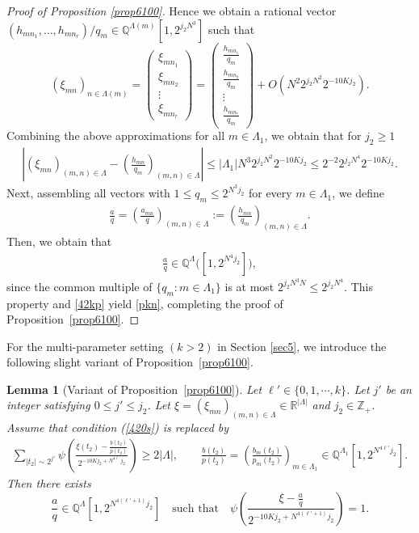 \documentclass[11 pt,letterpaper]{amsart}
\theoremstyle{plain}
\newtheorem{lemma}{Lemma}\numberwithin{lemma}{section}
\theoremstyle{definition}
\theoremstyle{remark} \theoremstyle{exam} \theoremstyle{ob}
\numberwithin{equation}{section}
\begin{document}
\begin{proof}[Proof of Proposition \ref{prop6100}]
Hence we obtain a rational vector 
$(h_{mn_1}, \dots, h_{mn_r})/q_m 
\in \mathbb{Q}^{\Lambda(m)}[1, 2^{j_2 N^3}]$ 
such that
\[
(\xi_{mn})_{n \in \Lambda(m)} =
\begin{pmatrix}
\xi_{mn_1}\\
\xi_{mn_2}\\
\vdots\\
\xi_{mn_r}
\end{pmatrix}
=
\left(\begin{matrix}\frac{h_{mn_1}}{q_m}\\
\frac{h_{mn_2}}{q_m}\\
 \vdots\\
\frac{h_{mn_{r}}}{q_m}
  \end{matrix}\right)
+ O\!\left(N^2 2^{j_2 N^2} 2^{-10Kj_2}\right).
\]
  Combining the above approximations for  all $m \in \Lambda_1$, we obtain that for $j_2\ge 1$
\begin{align}\label{42kp}
\left|
(\xi_{mn})_{(m,n)\in \Lambda}
- 
\left(\frac{h_{mn}}{q_m}\right)_{(m,n)\in \Lambda}
\right|
\le |\Lambda_1|
 N^3 2^{j_2 N^2} 2^{-10Kj_2}
\le 
2^{-2}2^{j_2 N^4} 2^{-10Kj_2}.
\end{align}
Next, assembling all vectors  with 
$1 \le q_m \le 2^{N^3 j_2}$ for every $m \in \Lambda_1$, 
we define
\begin{align}\label{yy}
\frac{a}{q}
=
\left( \frac{a_{mn}}{q} \right)_{(m,n)\in \Lambda}
:=
\left( \frac{h_{mn}}{q_m} \right)_{(m,n)\in \Lambda}.
\end{align} Then, we obtain that  \begin{align}\label{ep1}
\frac{a}{q} \in \mathbb{Q}^{\Lambda}\big([1, 2^{N^4 j_2}]\big),
\end{align} 
since the common multiple of $\{ q_m : m \in \Lambda_1 \}$ 
is at most $2^{j_2 N^3N} \le 2^{j_2 N^4}$.
This property and \eqref{42kp} yield \eqref{pkn}, completing the proof of Proposition~\ref{prop6100}.
\end{proof} 
For the multi-parameter setting $(k>2)$ in Section \ref{sec5}, we introduce the following slight variant of Proposition~\ref{prop6100}.
\begin{lemma}[Variant of Proposition~\ref{prop6100}]\label{vari61}
Let $\ell'\in  \{0,1,\cdots,k\}$.  Let $j'$ be an integer satisfying $0\leq j'\leq j_2$. Let $\xi=(\xi_{mn})_{(m,n)\in \Lambda}\in \mathbb{R}^{|\Lambda|}$ and $j_2\in \mathbb{Z}_{+}$. Assume that condition \emph{(\ref{420s})} is replaced by 
\begin{align*}
\sum_{|t_2| \sim 2^{j'}}
\psi\!\left(
  \frac{\xi(t_2) - \frac{b(t_2)}{p(t_2)}}{2^{-10K j_2 + N^{4\ell'} j_2}}
\right)
\ge 2|\Lambda|,
\qquad
\frac{b(t_2)}{p(t_2)}=\left( \frac{b_m(t_2)}{p_m(t_2)} \right)_{m\in \Lambda_1} \in \mathbb{Q}^{\Lambda_1}\!\left[1, 2^{N^{4\ell'} j_2}\right].
\end{align*}
Then there exists
\[
\frac{a}{q} \in \mathbb{Q}^{\Lambda}\!\left[1, 2^{N^{4(\ell'+1)} j_2}\right]
\quad \text{such that} \quad
\psi\!\left(
  \frac{\xi - \frac{a}{q}}{2^{-10K j_2 + N^{4(\ell'+1)} j_2}}
\right) = 1.
\]
\end{lemma}
\end{document}
